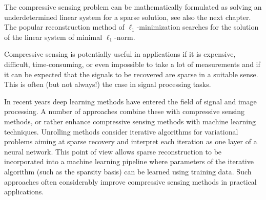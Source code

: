 \documentclass{svproc}
\newcommand{\corr}[1]{#1}
\newcommand{\0}{\boldsymbol{0}}
\newcommand{\1}{\boldsymbol{1}}
\begin{document}
The compressive sensing problem can be mathematically formulated as solving an underdetermined linear system for a sparse solution, see also the next chapter. The popular reconstruction method of $\ell_1$-minimization searches for the solution of the linear system of minimal $\ell_1$-norm.

Compressive sensing is potentially useful in applications if it is expensive, difficult, \corr{time-consuming,} or even impossible to take a lot of measurements and if it can be expected that the signals to be recovered are sparse in a suitable sense. This is often (but not always!) the case in signal processing tasks.

In recent years deep learning methods have entered the field of signal and image processing. A number of approaches combine these with compressive sensing methods, or rather enhance compressive sensing methods with machine learning techniques. 
Unrolling methods \cite{gregor2010learning,behboodi2022compressive} consider iterative algorithms for variational problems aiming at sparse recovery and interpret each iteration as one layer of a neural network. This point of view allows \corr{sparse reconstruction to be incorporated} into a machine learning pipeline where parameters of the iterative algorithm (such as the sparsity basis) can be learned using training data. Such approaches often considerably improve compressive sensing methods in practical applications.
\end{document}
